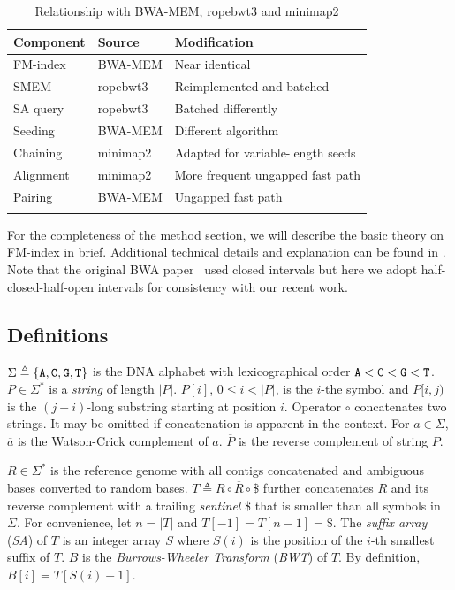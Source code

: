 \documentclass[webpdf,contemporary,large,namedate]{oup-authoring-template}%
\begin{document}
\begin{table}[t]
\caption{Relationship with BWA-MEM, ropebwt3 and minimap2\label{tab:relation}}
\begin{tabular*}{\columnwidth}{@{\extracolsep\fill}lll@{\extracolsep\fill}}
\toprule
Component & Source & Modification \\
\midrule
FM-index  & BWA-MEM  & Near identical \\
SMEM      & ropebwt3 & Reimplemented and batched \\
SA query  & ropebwt3 & Batched differently \\
Seeding   & BWA-MEM  & Different algorithm \\
Chaining  & minimap2 & Adapted for variable-length seeds \\
Alignment & minimap2 & More frequent ungapped fast path \\
Pairing   & BWA-MEM  & Ungapped fast path \\
\botrule
\end{tabular*}
\end{table}

For the completeness of the method section, we will describe the basic theory on FM-index in brief.
Additional technical details and explanation can be found in \citet{Li:2024ac}.
Note that the original BWA paper~\citep{Li:2009uq} used closed intervals but here we adopt half-closed-half-open intervals for consistency with our recent work.

\subsection{Definitions}

$\Sigma\triangleq\{{\tt A},{\tt C},{\tt G},{\tt T}\}$ is the DNA alphabet
with lexicographical order ${\tt A}<{\tt C}<{\tt G}<{\tt T}$.
$P\in\Sigma^*$ is a \emph{string} of length $|P|$.
$P[i]$, $0\le i<|P|$, is the $i$-the symbol and
$P[i,j)$ is the $(j-i)$-long substring starting at position $i$.
Operator $\circ$ concatenates two strings.
It may be omitted if concatenation is apparent in the context.
For $a\in\Sigma$, $\overline{a}$ is the Watson-Crick complement of $a$.
$\overline{P}$ is the reverse complement of string $P$.

$R\in\Sigma^*$ is the reference genome with all contigs concatenated and ambiguous bases converted to random bases.
$T\triangleq R\circ\overline{R}\circ\$$ further concatenates $R$ and its reverse complement
with a trailing \emph{sentinel} $\$$ that is smaller than all symbols in $\Sigma$.
For convenience, let $n=|T|$ and $T[-1]=T[n-1]=\$$.
The \emph{suffix array} (\emph{SA}) of $T$ is an integer array $S$ where
$S(i)$ is the position of the $i$-th smallest suffix of $T$.
$B$ is the \emph{Burrows-Wheeler Transform} (\emph{BWT}) of $T$.
By definition, $B[i]=T[S(i)-1]$.
\end{document}
